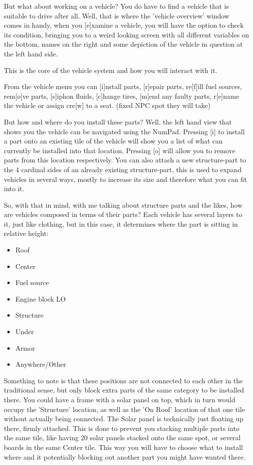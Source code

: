 But what about working on a vehicle? You do have to find a vehicle that is suitable to drive after all. Well, that is where the 'vehicle overview' window comes in handy, when you [e]xamine a vehicle, you will have the option to check its condition, bringing you to a weird looking screen with all different variables on the bottom, names on the right and some depiction of the vehicle in question at the left hand side.

This is the core of the vehicle system and how you will interact with it.

From the vehicle menu you can [i]nstall parts, [r]epair parts, re[f]ill fuel sources, rem[o]ve parts, [s]iphon fluids, [c]hange tires, [m]end any faulty parts, r[e]name the vehicle or assign cre[w] to a seat. (fixed NPC spot they will take)

But how and where do you install these parts? Well, the left hand view that shows you the vehicle can be navigated using the NumPad. Pressing [i] to install a part onto an existing tile of the vehicle will show you a list of what can currently be installed into that location. Pressing [o] will allow you to remove parts from this location respectively. You can also attach a new structure-part to the 4 cardinal sides of an already existing structure-part, this is used to expand vehicles in several ways, mostly to increase its size and therefore what you can fit into it.

So, with that in mind, with me talking about structure parts and the likes, how are vehicles composed in terms of their parts? Each vehicle has several layers to it, just like clothing, but in this case, it determines where the part is sitting in relative height:

\begin{itemize}
\item Roof
\item Center
\item Fuel source
\item Engine block LO
\item Structure
\item Under
\item Armor
\item Anywhere/Other
\end{itemize}

Something to note is that these positions are not connected to each other in the traditional sense, but only block extra parts of the same category to be installed there. You could have a frame with a solar panel on top, which in turn would occupy the 'Structure' location, as well as the 'On Roof' location of that one tile without actually being connected. The Solar panel is technically just floating up there, firmly attached. This is done to prevent you stacking multiple parts into the same tile, like having 20 solar panels stacked onto the same spot, or several boards in the same Center tile. This way you will have to choose what to install where and it potentially blocking out another part you might have wanted there.

